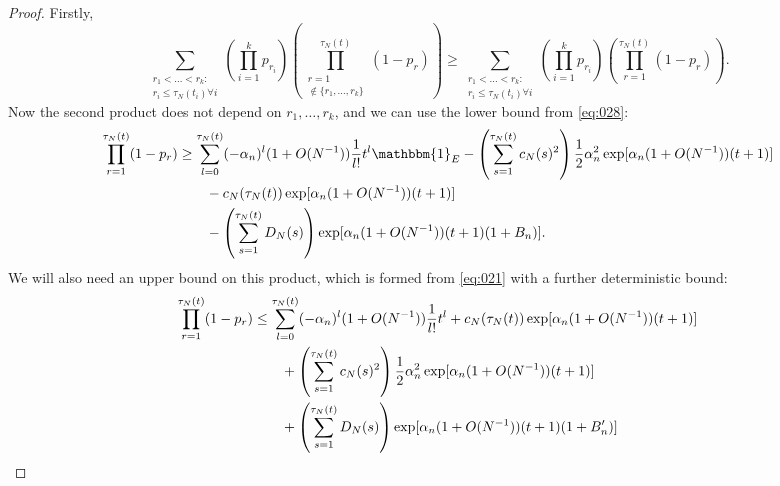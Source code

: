 \documentclass{article}
\newcommand{\1}[1]{\mathbbm{1}_{#1}}
\begin{document}
\begin{proof}
Firstly,
\begin{equation}
\sum_{\substack{r_1 <\dots< r_k :\\ r_i \leq \tau_N(t_i) \forall i}}
        \left( \prod_{i=1}^k p_{r_i} \right)
        \left( \prod_{\substack{r=1 \\ \notin \{r_1,\dots,r_k\} }}^{\tau_N(t)} 
        (1-p_r) \right)
\geq \sum_{\substack{r_1 <\dots< r_k :\\ r_i \leq \tau_N(t_i) \forall i}}
        \left( \prod_{i=1}^k p_{r_i} \right)
        \left( \prod_{r=1}^{\tau_N(t)} 
        (1-p_r) \right) . \label{eq:032a}
\end{equation}
Now the second product does not depend on $r_1,\dots,r_k$, and we can use the lower bound from \eqref{eq:028}:
\begin{align}
\prod_{r=1}^{\tau_N(t)} (1-p_r)
&\geq \sum_{l=0}^{\tau_N(t)} (-\alpha_n)^l (1+O(N^{-1})) 
        \frac{1}{l!} t^l \1{E}
        - \left( \sum_{s=1}^{\tau_N(t)} c_N(s)^2 \right)
        \frac{1}{2} \alpha_n^2 \exp[ \alpha_n (1+O(N^{-1})) (t+1) ]\notag\\
    &\qquad- c_N(\tau_N(t)) \exp[ \alpha_n (1+O(N^{-1})) (t+1) ] \notag\\
    &\qquad- \left( \sum_{s=1}^{\tau_N(t)} D_N(s) \right)
        \exp[ \alpha_n (1+O(N^{-1})) (t+1) (1+B_n) ] .\label{eq:033a}
\end{align}
We will also need an upper bound on this product, which is formed from \eqref{eq:021} with a further deterministic bound:
\begin{align}
\prod_{r=1}^{\tau_N(t)} (1-p_r)
&\leq \sum_{l=0}^{\tau_N(t)} (-\alpha_n)^l (1+O(N^{-1})) \frac{1}{l!} t^l
    + c_N(\tau_N(t)) \exp[ \alpha_n (1+O(N^{-1})) (t+1) ] \notag\\
    &\qquad+ \left( \sum_{s=1}^{\tau_N(t)} c_N(s)^2 \right)
        \frac{1}{2} \alpha_n^2 \exp[ \alpha_n (1+O(N^{-1})) (t+1) ] \notag\\
    &\qquad+ \left( \sum_{s=1}^{\tau_N(t)} D_N(s) \right)
        \exp[ \alpha_n (1+O(N^{-1})) (t+1) (1+B_n^\prime) ] \notag\\

\end{align}
\end{proof}
\end{document}
